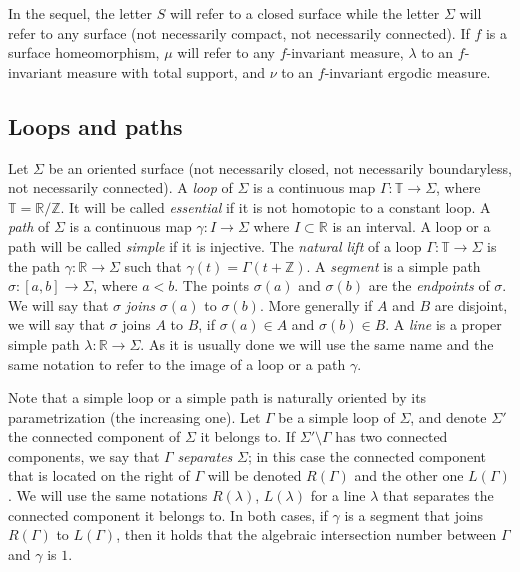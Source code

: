 \documentclass[10pt,a4paper]{article}
\theoremstyle{definition}
\theoremstyle{plain}
\numberwithin{equation}{section}
\numberwithin{figure}{section}
\newcommand{\R}{\mathbb{R}}
\newcommand{\Z}{\mathbb{Z}}
\newcommand{\T}{\mathbb{T}}
\begin{document}
In the sequel, the letter $S$ will refer to a closed surface while the letter $\Sigma$ will refer to any surface (not necessarily compact, not necessarily connected). If $f$ is a surface homeomorphism, $\mu$ will refer to any $f$-invariant measure, $\lambda$ to an $f$-invariant measure with total support, and $\nu$ to an $f$-invariant ergodic measure.



\subsection{Loops and paths}\label{ss:loopsandpaths}



Let $\Sigma$ be an oriented surface (not necessarily closed, not necessarily boundaryless, not necessarily connected). A \emph{loop} of $\Sigma$ is a continuous map $\Gamma: \T\to \Sigma$, where $\T=\R/\Z$. It will be called \emph{essential} if it is not homotopic to a constant loop. A \emph{path} of $\Sigma$ is a continuous map $\gamma: I\to \Sigma$ where $I\subset \R$ is an interval. A loop or a path will be called \emph{simple} if it is injective. The \emph{natural lift} of a loop $\Gamma: \T\to \Sigma$ is the path $\gamma:\R\to \Sigma$ such that $\gamma(t)=\Gamma(t+\Z)$. A \emph{segment} is a simple path $\sigma:[a,b]\to \Sigma$, where $a<b$. The points $\sigma(a)$ and $\sigma(b)$ are the \emph{endpoints} of $\sigma$. We will say that $\sigma$ \emph{joins} $\sigma(a)$ to $\sigma(b)$. More generally if $A$ and $B$ are disjoint, we will say that $\sigma$ joins $A$ to $B$, if $\sigma(a)\in A$ and $\sigma(b)\in B$. A \emph{line} is a proper simple path $\lambda:\R\to \Sigma$. As it is usually done we will use the same name and the same notation to refer to the image of a loop or a path $\gamma$.

Note that a simple loop or a simple path is naturally oriented by its parametrization (the increasing one). Let $\Gamma$ be a simple loop of $\Sigma$, and denote $\Sigma'$ the connected component of $\Sigma$ it belongs to. If $\Sigma'\setminus\Gamma$ has two connected components, we say that $\Gamma$ \emph{separates} $\Sigma$; in this case the connected component that is located on the right of $\Gamma$ will be denoted $R(\Gamma)$ and the other one $L(\Gamma)$. We will use the same notations $R(\lambda)$, $L(\lambda)$ for a line $\lambda$ that separates the connected component it belongs to. In both cases, if $\gamma$ is a segment that joins $R(\Gamma)$ to $L(\Gamma)$, then it holds that the algebraic intersection number between $\Gamma$ and $\gamma$ is $1$.
\end{document}
